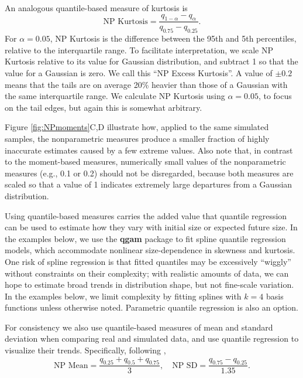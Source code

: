 \documentclass[12pt]{article}
\newcommand{\be}{\begin{equation}}
\newcommand{\ee}{\end{equation}}
\begin{document}
\begin{spacing}{1.9}
An analogous quantile-based measure of kurtosis \citep{jones-etal-1994} is 
\be
\mbox{NP Kurtosis}  = \frac{q_{1-\alpha} - q_{\alpha}}{q_{0.75} - q_{0.25}}.
\label{eqn:NPkurt}
\ee
For $\alpha=0.05$, NP Kurtosis is the difference between the 95th and 5th percentiles, relative to the interquartile range. 
To facilitate interpretation, we scale NP Kurtosis relative to its value for Gaussian distribution, and subtract 1 so that the value for a Gaussian is zero. 
We call this ``NP Excess Kurtosis''. 
A value of $\pm 0.2$ means that the tails are on average 20\% heavier than those of a Gaussian with the same interquartile range. 
We calculate NP Kurtosis using $\alpha=0.05$, to focus on the tail edges, but again this is somewhat arbitrary. 

Figure \ref{fig:NPmoments}C,D illustrate how, applied to the same simulated samples, the nonparametric measures produce a smaller fraction of highly inaccurate estimates caused by a few extreme values. 
Also note that, in contrast to the moment-based measures, numerically small values of the nonparametric measures (e.g., 0.1 or 0.2) should not be disregarded, because both measures are scaled so that a value of 1 indicates extremely large departures from a Gaussian distribution. 

Using quantile-based measures carries the added value that quantile regression can be used to estimate how they vary with initial size or expected future size. 
In the examples below, we use the \textbf{qgam} package \citep{fasiolo2020qgam} to fit spline quantile regression models, which accommodate nonlinear size-dependence in skewness and kurtosis. 
One risk of spline regression is that fitted quantiles may be excessively ``wiggly'' without constraints on their complexity; with realistic amounts of data, we can hope to estimate broad trends in distribution shape, but not fine-scale variation.  
In the examples below, we limit complexity by fitting splines with $k=4$ basis functions unless otherwise noted. 
Parametric quantile regression is also an option. 

For consistency we also use quantile-based measures of mean and standard deviation when comparing real and simulated data, and use quantile regression to visualize their trends.  
Specifically, following \cite{wan2014estimating},
\be
\mbox{NP Mean}  = \frac{q_{0.25} + q_{0.5} + q_{0.75}}{3}, \quad  \mbox{NP SD}  = \frac{q_{0.75} - q_{0.25}}{1.35}.
\ee


\end{spacing}
\end{document}
